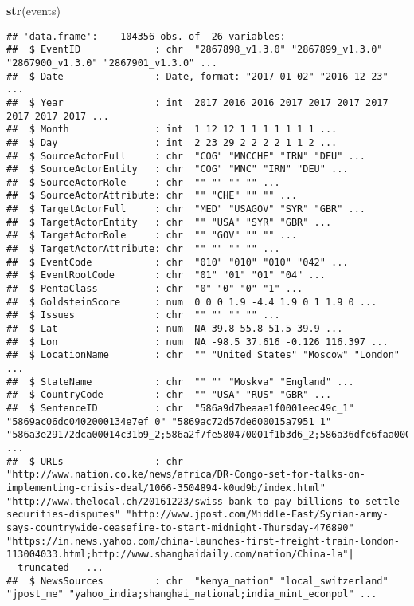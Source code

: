 \documentclass[]{article}
\newenvironment{Shaded}{\begin{snugshade}}{\end{snugshade}}
\newcommand{\KeywordTok}[1]{\textcolor[rgb]{0.13,0.29,0.53}{\textbf{{#1}}}}
\newcommand{\NormalTok}[1]{{#1}}
\begin{document}
\begin{Shaded}
\begin{Highlighting}[]
\KeywordTok{str}\NormalTok{(events)}
\end{Highlighting}
\end{Shaded}

\begin{verbatim}
## 'data.frame':    104356 obs. of  26 variables:
##  $ EventID             : chr  "2867898_v1.3.0" "2867899_v1.3.0" "2867900_v1.3.0" "2867901_v1.3.0" ...
##  $ Date                : Date, format: "2017-01-02" "2016-12-23" ...
##  $ Year                : int  2017 2016 2016 2017 2017 2017 2017 2017 2017 2017 ...
##  $ Month               : int  1 12 12 1 1 1 1 1 1 1 ...
##  $ Day                 : int  2 23 29 2 2 2 2 1 1 2 ...
##  $ SourceActorFull     : chr  "COG" "MNCCHE" "IRN" "DEU" ...
##  $ SourceActorEntity   : chr  "COG" "MNC" "IRN" "DEU" ...
##  $ SourceActorRole     : chr  "" "" "" "" ...
##  $ SourceActorAttribute: chr  "" "CHE" "" "" ...
##  $ TargetActorFull     : chr  "MED" "USAGOV" "SYR" "GBR" ...
##  $ TargetActorEntity   : chr  "" "USA" "SYR" "GBR" ...
##  $ TargetActorRole     : chr  "" "GOV" "" "" ...
##  $ TargetActorAttribute: chr  "" "" "" "" ...
##  $ EventCode           : chr  "010" "010" "010" "042" ...
##  $ EventRootCode       : chr  "01" "01" "01" "04" ...
##  $ PentaClass          : chr  "0" "0" "0" "1" ...
##  $ GoldsteinScore      : num  0 0 0 1.9 -4.4 1.9 0 1 1.9 0 ...
##  $ Issues              : chr  "" "" "" "" ...
##  $ Lat                 : num  NA 39.8 55.8 51.5 39.9 ...
##  $ Lon                 : num  NA -98.5 37.616 -0.126 116.397 ...
##  $ LocationName        : chr  "" "United States" "Moscow" "London" ...
##  $ StateName           : chr  "" "" "Moskva" "England" ...
##  $ CountryCode         : chr  "" "USA" "RUS" "GBR" ...
##  $ SentenceID          : chr  "586a9d7beaae1f0001eec49c_1" "5869ac06dc0402000134e7ef_0" "5869ac72d57de600015a7951_1" "586a3e29172dca00014c31b9_2;586a2f7fe580470001f1b3d6_2;586a36dfc6faa00001190301_3" ...
##  $ URLs                : chr  "http://www.nation.co.ke/news/africa/DR-Congo-set-for-talks-on-implementing-crisis-deal/1066-3504894-k0ud9b/index.html" "http://www.thelocal.ch/20161223/swiss-bank-to-pay-billions-to-settle-securities-disputes" "http://www.jpost.com/Middle-East/Syrian-army-says-countrywide-ceasefire-to-start-midnight-Thursday-476890" "https://in.news.yahoo.com/china-launches-first-freight-train-london-113004033.html;http://www.shanghaidaily.com/nation/China-la"| __truncated__ ...
##  $ NewsSources         : chr  "kenya_nation" "local_switzerland" "jpost_me" "yahoo_india;shanghai_national;india_mint_econpol" ...
\end{verbatim}
\end{document}
